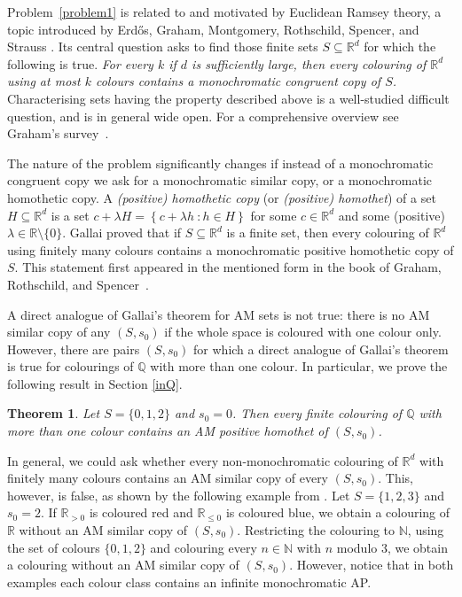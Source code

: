 \documentclass[12pt]{article}
\newcommand{\setbuilder}[2]{\left\{#1\ \colon #2\right\}}
\theoremstyle{plain}
\newtheorem{theorem}{Theorem}
\theoremstyle{definition}
\begin{document}
Problem~\ref{problem1} is related to and motivated by Euclidean Ramsey theory, a topic introduced by Erd\H os, Graham, Montgomery, Rothschild, Spencer, and Strauss \cite{EGMRSS}. Its central question asks to find those finite sets $S\subseteq \mathbb{R}^d$ for which the following is true. \emph{For every $k$ if $d$ is sufficiently large, then every colouring of $\mathbb{R}^d$ using at most $k$ colours contains a monochromatic congruent copy of $S$.}
Characterising sets having the property described above is a well-studied difficult question, and is in general wide open. For a comprehensive overview see Graham's survey~\cite{graham}.


The nature of the problem significantly changes if instead of a monochromatic congruent copy we ask for a monochromatic similar copy, or a monochromatic homothetic copy.
A \emph{(positive) homothetic copy} (or \emph{(positive) homothet}) of a set $H\subseteq \mathbb{R}^d$ is a set $c+\lambda H=\setbuilder{c+\lambda h}{h\in H}$ for some $c\in\mathbb{R}^d$ and some (positive) $\lambda\in \mathbb{R}\setminus\{0\}$. Gallai proved that if $S\subseteq \mathbb{R}^d$ is a finite set, then every colouring of $\mathbb{R}^d$ using finitely many colours contains a monochromatic positive homothetic copy of $S$. This statement first appeared in the mentioned form in the book of Graham, Rothschild, and Spencer~\cite{gallaiR}.

A direct analogue of Gallai's theorem for AM sets is not true: there is no AM similar copy of any $(S,s_0)$ if the whole space is coloured with one colour only. However, there are pairs $(S,s_0)$ for which a direct analogue of Gallai's theorem is true for colourings of $\mathbb{Q}$ with more than one colour. In particular, we prove the following result in Section \ref{inQ}.

\begin{theorem}\label{iQ} Let $S=\{0,1,2\}$ and $s_0=0$. Then every finite colouring of $\mathbb{Q}$ with more than one colour contains an AM positive homothet of $(S,s_0)$.
\end{theorem}

In general, we could ask whether every non-monochromatic colouring of $\mathbb{R}^d$ with finitely many colours contains an AM similar copy of every $(S,s_0)$. This, however, is false, as shown by the following example from \cite{EGMRSS3}. Let $S=\{1,2,3\}$ and $s_0=2$. If $\mathbb{R}_{>0}$ is coloured red and $\mathbb{R}_{\leq 0}$ is coloured blue, we obtain a colouring of $\mathbb{R}$ without an AM similar copy of $(S,s_0)$. 
Restricting the colouring to $\mathbb N$, using the set of colours $\{0,1,2\}$ and colouring every $n\in \mathbb{N}$ with $n$ modulo $3$, we obtain a colouring without an AM similar copy of $(S,s_0)$.
However, notice that in both examples each colour class contains an infinite monochromatic AP.
\end{document}
